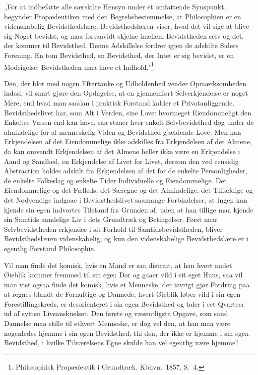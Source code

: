 \documentclass[12pt]{book}
\begin{document}
„For at indbefatte alle særskilte Hensyn under et omfattende Synspunkt, begynder
Propædeutiken med den Begrebsbestemmelse, at Philosophien er en videnskabelig
Bevidsthedslære. Bevidsthedslæren viser, hvad det vil sige at blive sig Noget
bevidst, og maa forsaavidt skjelne imellem Bevidstheden selv og det, der kommer
til Bevidsthed. Denne Adskillelse fordrer igjen de adskilte Siders Forening. En
tom Bevidsthed, en Bevidsthed, der Intet er sig bevidst, er en Modsigelse:
Bevidstheden maa have et Indhold."\footnote{Philosophisk Propædeutik i Grundtræk.
Kbhvn.\ 1857, S.~4.}

Den, der blot med nogen Eftertanke og Udholdenhed vender Opmærksomheden indad,
vil snart gjøre den Opdagelse, at en gjennemført Selverkjendelse er noget Mere,
end hvad man saadan i praktisk Forstand kalder et Privatanliggende.
Bevidsthedslivet har, som Alt i Verden, sine Love: hvormeget Eiendommeligt den
Enkeltes Væsen end kan have, saa staaer hver enkelt Selvbevidsthed dog under de
almindelige for al menneskelig Viden og Bevidsthed gjældende Love. Men kan
Erkjendelsen af det Eiendommelige ikke adskilles fra Erkjendelsen af det Almene,
da kan omvendt Erkjendelsen af det Almene heller ikke være en Erkjendelse i Aand
og Sandhed, en Erkjendelse af Livet for Livet, dersom den ved eensidig
Abstraction holdes adskilt fra
Erkjendelsen af det for de enkelte Personligheder, de enkelte Folkeslag og
enkelte Tider Individuelle og Eiendommelige. Det Eiendommelige og det Fælleds,
det Særegne og det Almindelige, det Tilfældige og det Nødvendige indgaae i
Bevidsthedslivet saamange Forbindelser, at Ingen kan kjende sin egen indvortes
Tilstand fra Grunden af, uden at han tillige maa kjende sin Samtids aandelige Liv
i dets Grundtræk og Betingelser. Først naar Selvbevidstheden erkjendes i sit
Forhold til Samtidsbevidstheden, bliver Bevidsthedslæren videnskabelig; og kun
den videnskabelige Bevidsthedslære er i egentlig Forstand Philosophie.

Vil man finde det komisk, hvis en Mand er saa distrait, at han hvert andet
Øieblik kommer fremmed til sin egen Dør og gaaer vild i sit eget Huus, saa vil
man vist ogsaa finde det komisk, hvis et Menneske, der iøvrigt gjør Fordring paa
at regnes blandt de Fornuftige og Dannede, hvert Øieblik løber vild i sin egen
Forestillingskreds, er desorienteret i sin egen Bevidsthed og taler i eet
Qvarteer ud af sytten Livsanskuelser. Den første og væsentligste Opgave, som sand
Dannelse maa stille til ethvert Menneske, er dog vel den, at han maa være
nogenledes hjemme i sin egen Bevidsthed; thi den, der ikke er hjemme i sin egen
Bevidsthed, i hvilke Tilværelsens Egne skulde han vel egentlig være hjemme?
\end{document}
